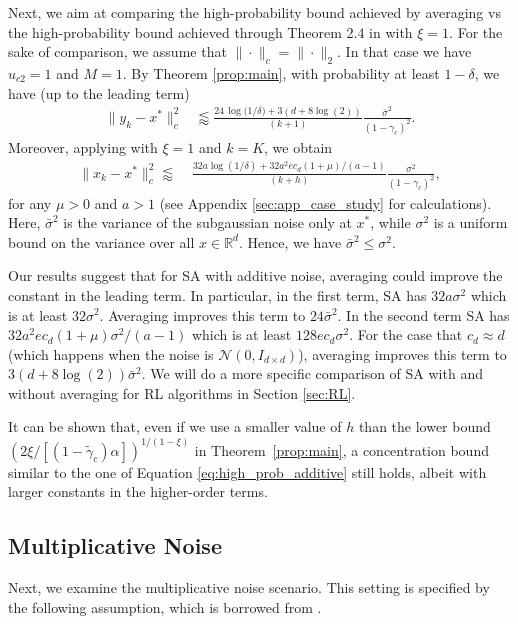 \documentclass[letterpaper, 10 pt]{article}
\begin{document}
Next, we aim at comparing the high-probability bound achieved by averaging vs the high-probability bound achieved through Theorem 2.4 in \cite{chen2023concentration} with $\xi=1$. For the sake of comparison, we assume that $\|\cdot\|_c=\|\cdot\|_2$. In that case we have $u_{c2}= 1$ and $M=1$. By Theorem \ref{prop:main}, with probability at least $1-\delta$, we have (up to the leading term)
\begin{align*}
\|y_k-x^*\|^2_c & \lessapprox \frac{24 \,\log\!\bigl(1/\delta\bigr) + 3(d+8\log(2))}{(k+1)}\frac{\bar{\sigma}^2}{(1-\gamma_c)^2}.
\end{align*}
Moreover, applying \cite[Theorem 2.4]{chen2023concentration} with $\xi=1$ and $k=K$, we obtain
\begin{align*}
    \|x_k-x^*\|_c^2\lessapprox\;&\frac{32a\log(1/\delta) + 32a^2e c_d(1+\mu)/(a-1)}{(k+h)}\frac{\sigma^2}{(1-\gamma_c)^2},
\end{align*}
for any $\mu>0$ and $a>1$ (see Appendix \ref{sec:app_case_study} for calculations).  Here, $\bar{\sigma}^2$ is the variance of the subgaussian noise only at $x^*$, while $\sigma^2$ is  a uniform bound on the variance over all $x\in\mathbb{R}^d$. Hence, we have $\bar{\sigma}^2\leq \sigma^2$. 

Our results suggest that for SA with additive noise, averaging could improve the constant in the leading term. In particular, in the first term, SA has $32a\sigma^2$ which is at least $32\sigma^2$. Averaging improves this term to $24\bar{\sigma}^2$. In the second term SA has $32 a^2ec_d (1+\mu)\sigma^2/(a-1)$ which is at least $128ec_d\sigma^2$. For the case that $c_d\approx d$ (which happens when the noise is $\mathcal{N}(0,I_{d\times d})$), averaging improves this term to $3(d+8\log(2))\bar{\sigma}^2$. We will do a more specific comparison of SA with and without averaging for RL algorithms in Section \ref{sec:RL}.


\begin{remark}
It can be shown that, even if we use a smaller value of $h$ than the lower bound $(2\xi/[(1-\tilde{\gamma}_c)\alpha])^{1/(1-\xi)}$ in Theorem~\ref{prop:main}, a concentration bound similar to the one of Equation \eqref{eq:high_prob_additive} still holds, albeit with larger constants in the higher-order terms. 
\end{remark}

\subsection{Multiplicative Noise}\label{sec:mult_noise}
Next, we examine the multiplicative noise scenario. This setting is specified by the following assumption, which is borrowed from \cite{moulines2011non}.
\end{document}
